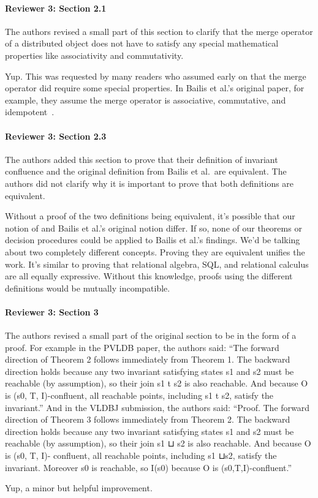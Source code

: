 \documentclass[9pt]{article}
\begin{document}
\begin{multicols*}{2}
\paragraph{Reviewer 3: Section 2.1}
\begin{feedback}
  The authors revised a small part of this section to clarify that the merge
  operator of a distributed object does not have to satisfy any special
  mathematical properties like associativity and commutativity.
\end{feedback}
Yup. This was requested by many readers who assumed early on that the merge
operator did require some special properties. In Bailis et al.'s original
paper, for example, they assume the merge operator is associative, commutative,
and idempotent~\cite{bailis2014coordination}.

\paragraph{Reviewer 3: Section 2.3}
\begin{feedback}
  The authors added this section to prove that their definition of invariant
  confluence and the original definition from Bailis et al.\ are equivalent.
  The authors did not clarify why it is important to prove that both
  definitions are equivalent.
\end{feedback}
Without a proof of the two definitions being equivalent, it's possible that our
notion of \invariantconfluence{} and Bailis et al.'s original notion differ.
If so, none of our theorems or decision procedures could be applied to Bailis et
al.'s findings. We'd be talking about two completely different concepts.
Proving they are equivalent unifies the work. It's similar to proving that
relational algebra, SQL, and relational calculus are all equally expressive.
Without this knowledge, proofs using the different definitions would be
mutually incompatible.

\paragraph{Reviewer 3: Section 3}
\begin{feedback}
  The authors revised a small part of the original section to be in the form of
  a proof. For example in the PVLDB paper, the authors said: ``The forward
  direction of Theorem 2 follows immediately from Theorem 1. The backward
  direction holds because any two invariant satisfying states s1 and s2 must be
  reachable (by assumption), so their join s1 t s2 is also reachable. And
  because O is (s0, T, I)-confluent, all reachable points, including s1 t s2,
  satisfy the invariant.'' And in the VLDBJ submission, the authors said:
  ``Proof. The forward direction of Theorem 3 follows immediately from Theorem
  2. The backward direction holds because any two invariant satisfying states
  s1 and s2 must be reachable (by assumption), so their join s1 ⊔ s2 is also
  reachable. And because O is (s0, T, I)- confluent, all reachable points,
  including s1 ⊔s2, satisfy the invariant. Moreover s0 is reachable, so I(s0)
  because O is (s0,T,I)-confluent.''
\end{feedback}
Yup, a minor but helpful improvement.


\end{multicols*}
\end{document}

